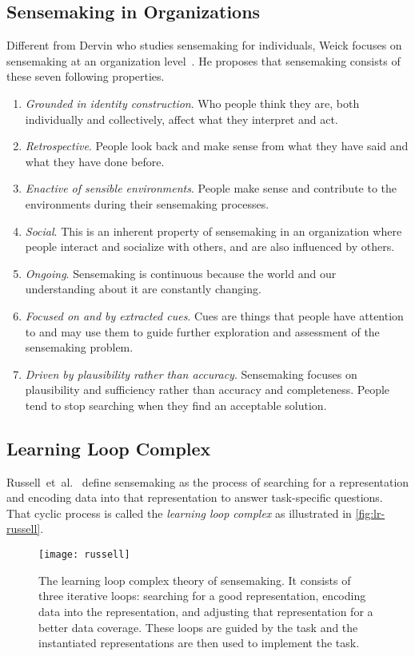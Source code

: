 \subsection{Sensemaking in Organizations}
Different from Dervin who studies sensemaking for individuals, Weick focuses on sensemaking at an organization level~\cite{Weick1995}. He proposes that sensemaking consists of these seven following properties.

\begin{enumerate}
	\item \emph{Grounded in identity construction}. Who people think they are, both individually and collectively, affect what they interpret and act.
	\item \emph{Retrospective}. People look back and make sense from what they have said and what they have done before.
	\item \emph{Enactive of sensible environments}. People make sense and contribute to the environments during their sensemaking processes.
	\item \emph{Social}. This is an inherent property of sensemaking in an organization where people interact and socialize with others, and are also influenced by others.
	\item \emph{Ongoing}. Sensemaking is continuous because the world and our understanding about it are constantly changing.
	\item \emph{Focused on and by extracted cues}. Cues are things that people have attention to and may use them to guide further exploration and assessment of the sensemaking problem.
	\item \emph{Driven by plausibility rather than accuracy}. Sensemaking focuses on plausibility and sufficiency rather than accuracy and completeness. People tend to stop searching when they find an acceptable solution.
\end{enumerate}

\subsection{Learning Loop Complex}
Russell~et~al.~\cite{Russell1993} define sensemaking as the process of searching for a representation and encoding data into that representation to answer task-specific questions. That cyclic process is called the \emph{learning loop complex} as illustrated in \autoref{fig:lr-russell}. 

\begin{figure}[!htb]
	\centering
	\texttt{[image: russell]}
	\caption[The learning loop complex theory of sensemaking]{The learning loop complex theory of sensemaking. It consists of three iterative loops: searching for a good representation, encoding data into the representation, and adjusting that representation for a better data coverage. These loops are guided by the task and the instantiated representations are then used to implement the task. }
	\label{fig:lr-russell}
\end{figure}

